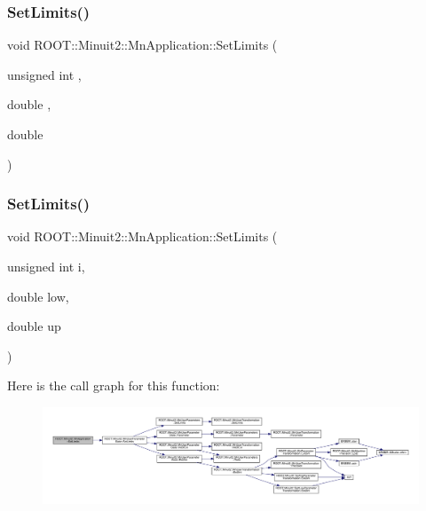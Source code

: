\subsubsection{\texorpdfstring{SetLimits()}{SetLimits()}\hspace{0.1cm}{\footnotesize\ttfamily [1/4]}}
{\footnotesize\ttfamily void R\+O\+O\+T\+::\+Minuit2\+::\+Mn\+Application\+::\+Set\+Limits (\begin{DoxyParamCaption}\item[{unsigned int}]{,  }\item[{double}]{,  }\item[{double}]{ }\end{DoxyParamCaption})}

\mbox{\label{classROOT_1_1Minuit2_1_1MnApplication_ad6c07174e01b117cb67a43211753ae06}} 
\subsubsection{\texorpdfstring{SetLimits()}{SetLimits()}\hspace{0.1cm}{\footnotesize\ttfamily [2/4]}}
{\footnotesize\ttfamily void R\+O\+O\+T\+::\+Minuit2\+::\+Mn\+Application\+::\+Set\+Limits (\begin{DoxyParamCaption}\item[{unsigned int}]{i,  }\item[{double}]{low,  }\item[{double}]{up }\end{DoxyParamCaption})}

Here is the call graph for this function\+:\nopagebreak
\begin{figure}[H]
\begin{center}
\leavevmode
\includegraphics[width=350pt]{df/dd5/classROOT_1_1Minuit2_1_1MnApplication_ad6c07174e01b117cb67a43211753ae06_cgraph}
\end{center}
\end{figure}
\mbox{\label{classROOT_1_1Minuit2_1_1MnApplication_a7c5404de0cf4efac550bea31f3cd4088}} 
